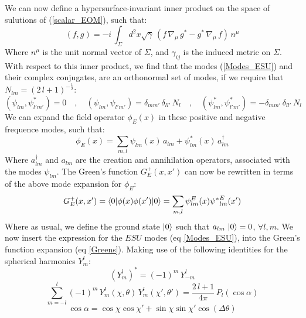 %
%
We can now define a hypersurface-invariant inner product on the space of sulutions of (\ref{scalar_EOM}), such that:
%
%
\begin{equation}
(f,g) = -i \, \int_{\Sigma} d^2x \sqrt{\gamma} \, \left( f \, \nabla_{\mu} \, g^* - g^* \, \nabla_{\mu} \, f \right) \, n^{\mu}
\end{equation}
%
%
Where $n^{\mu}$ is the unit normal vector of $\Sigma$, and $\gamma_{ij}$ is the induced metric on $\Sigma$. With respect to this inner product, we find that the modes (\ref{Modes_ESU}) and their complex conjugates, are an orthonormal set of modes, if we require that $N_{lm} = (2 \, l + 1)^{-\frac{1}{2}}$:
%
%
\begin{equation}
(\psi_{lm}, \psi^*_{l'm'}) = 0
\quad , \quad
(\psi_{lm}, \psi_{l'm'}) = \delta_{mm'} \, \delta_{ll'} \, N_l
\quad , \quad
(\psi^*_{lm}, \psi^*_{l'm'}) = -\delta_{mm'} \, \delta_{ll'} \, N_l
\end{equation}
%
%
We can expand the field operator $\phi_E(x)$ in these positive and negative frequence modes, such that:
%
%
\begin{equation}
\phi_E(x) = \sum_{m, l} \psi_{lm}(x) \, a_{lm} +  \psi^*_{lm}(x) \, a^{\dagger}_{lm}
\end{equation}
%
%
Where $a^{\dagger}_{lm}$ and $a_{lm}$ are the creation and annihilation operators, associated with the modes $\psi_{lm}$. The Green's function $G_E^+(x, x')$ can now be rewritten in terms of the above mode expansion for $\phi_E$:
%
%
\begin{equation}\label{Greens}
G_E^+(x,x') = {\braket{0 | \phi(x) \phi(x') | 0}} = \sum_{m,l} \psi^E_{l m}(x) {\psi^*}^E_{l m}(x')
\end{equation}
%
%
Where as usual, we define the ground state $\ket{0}$ such that $a_{lm} \, \ket{0} = 0$, $\forall l,m$. We now insert the expression for the $ESU$ modes (eq \ref{Modes_ESU}), into the Green's function expansion (eq \ref{Greens}). Making use of the following identities for the spherical harmonics $Y^l_m$:
%
%
\begin{equation}
(Y^l_m)^* = (-1)^m \, Y^l_{-m}
\end{equation}
%
\begin{equation}
\sum_{m = -l}^l  (-1)^m \, Y^l_m(\chi, \theta) \, Y^l_m(\chi', \theta') = \frac{2 \, l + 1}{4 \pi} \, P_l( \cos \alpha )
\end{equation}
%
\begin{equation}
\cos \alpha = \cos \chi  \cos \chi'  + \sin \chi  \sin \chi'  \cos (\Delta \theta)
\end{equation}
